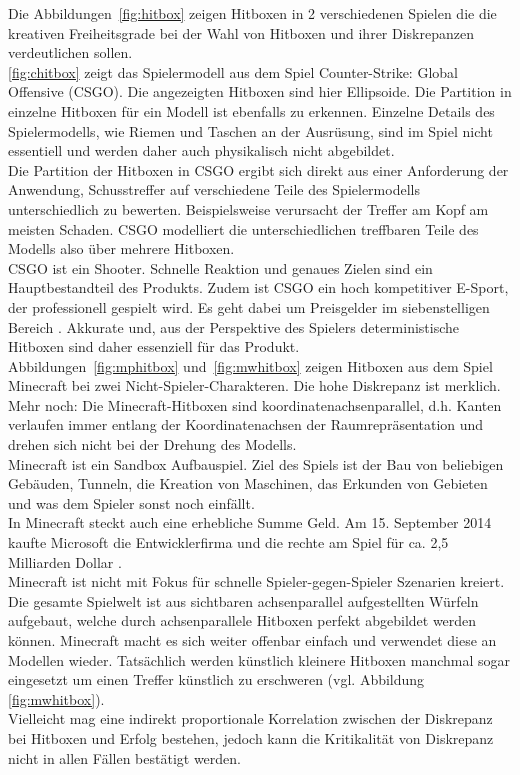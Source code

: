 Die Abbildungen~\ref{fig:hitbox} zeigen Hitboxen in 2 verschiedenen Spielen die die kreativen Freiheitsgrade bei der Wahl von Hitboxen und ihrer Diskrepanzen verdeutlichen sollen.\\
\ref{fig:chitbox} zeigt das Spielermodell aus dem Spiel Counter-Strike: Global Offensive (CSGO). Die angezeigten Hitboxen sind hier Ellipsoide.
Die Partition in einzelne Hitboxen für ein Modell ist ebenfalls zu erkennen.
Einzelne Details des Spielermodells, wie Riemen und Taschen an der Ausrüsung, sind im Spiel nicht essentiell und werden daher auch physikalisch nicht abgebildet.\\
Die Partition der Hitboxen in CSGO ergibt sich direkt aus einer Anforderung der Anwendung, Schusstreffer auf verschiedene Teile des Spielermodells unterschiedlich zu bewerten. Beispielsweise verursacht der Treffer am Kopf am meisten Schaden. CSGO modelliert die unterschiedlichen treffbaren Teile des Modells also über mehrere Hitboxen.\\
CSGO ist ein Shooter. Schnelle Reaktion und genaues Zielen sind ein Hauptbestandteil des Produkts. Zudem ist CSGO ein hoch kompetitiver E-Sport, der professionell gespielt wird. Es geht dabei um Preisgelder im siebenstelligen Bereich \cite{csgoprice}. Akkurate und, aus der Perspektive des Spielers deterministische Hitboxen sind daher essenziell für das Produkt.\\
Abbildungen~\ref{fig:mphitbox} und~\ref{fig:mwhitbox} zeigen Hitboxen aus dem Spiel Minecraft bei zwei Nicht-Spieler-Charakteren. Die hohe Diskrepanz ist merklich. Mehr noch: Die Minecraft-Hitboxen sind koordinatenachsenparallel, d.h. Kanten verlaufen immer entlang der Koordinatenachsen der Raumrepräsentation und drehen sich nicht bei der Drehung des Modells.\\
Minecraft ist ein Sandbox Aufbauspiel. Ziel des Spiels ist der Bau von beliebigen Gebäuden, Tunneln, die Kreation von Maschinen, das Erkunden von Gebieten und was dem Spieler sonst noch einfällt.\\
In Minecraft steckt auch eine erhebliche Summe Geld. Am 15. September 2014 kaufte Microsoft die Entwicklerfirma und die rechte am Spiel für ca. 2,5 Milliarden Dollar \cite{buyminecraft}.\\
Minecraft ist nicht mit Fokus für schnelle Spieler-gegen-Spieler Szenarien kreiert. Die gesamte Spielwelt ist aus sichtbaren achsenparallel aufgestellten Würfeln aufgebaut, welche durch achsenparallele Hitboxen perfekt abgebildet werden können. Minecraft macht es sich weiter offenbar einfach und verwendet diese an Modellen wieder. Tatsächlich werden künstlich kleinere Hitboxen manchmal sogar eingesetzt um einen Treffer künstlich zu erschweren (vgl. Abbildung \ref{fig:mwhitbox}).\\
Vielleicht mag eine indirekt proportionale Korrelation zwischen der Diskrepanz bei Hitboxen und Erfolg bestehen, jedoch kann die Kritikalität von Diskrepanz nicht in allen Fällen bestätigt werden.
